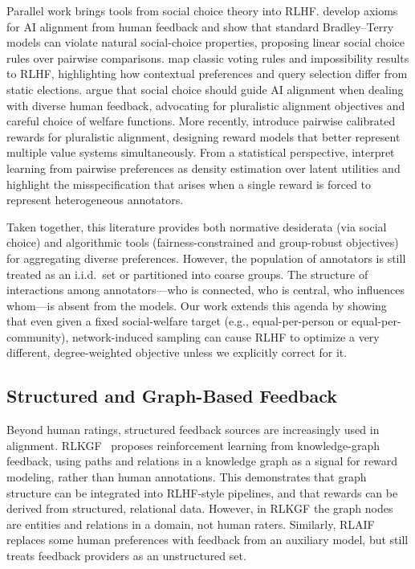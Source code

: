 \documentclass{article}
\theoremstyle{plain}
\theoremstyle{definition}
\theoremstyle{remark}
\begin{document}
Parallel work brings tools from social choice theory into RLHF.
\citet{ge2024axioms} develop axioms for AI alignment from human feedback and show that standard Bradley--Terry models can violate natural social-choice properties, proposing linear social choice rules over pairwise comparisons.
\citet{dai2024mapping} map classic voting rules and impossibility results to RLHF, highlighting how contextual preferences and query selection differ from static elections.
\citet{conitzer2024socialchoice} argue that social choice should guide AI alignment when dealing with diverse human feedback, advocating for pluralistic alignment objectives and careful choice of welfare functions.
More recently, \citet{halpern2025pairwise_calibrated} introduce pairwise calibrated rewards for pluralistic alignment, designing reward models that better represent multiple value systems simultaneously.
From a statistical perspective, \citet{dumoulin2024density_pairwise} interpret learning from pairwise preferences as density estimation over latent utilities and highlight the misspecification that arises when a single reward is forced to represent heterogeneous annotators.

Taken together, this literature provides both normative desiderata (via social choice) and algorithmic tools (fairness-constrained and group-robust objectives) for aggregating diverse preferences.
However, the population of annotators is still treated as an i.i.d.\ set or partitioned into coarse groups.
The structure of interactions among annotators---who is connected, who is central, who influences whom---is absent from the models.
Our work extends this agenda by showing that even given a fixed social-welfare target (e.g., equal-per-person or equal-per-community), network-induced sampling can cause RLHF to optimize a very different, degree-weighted objective unless we explicitly correct for it.

\subsection{Structured and Graph-Based Feedback}
\label{sec:rw_graph_feedback}

Beyond human ratings, structured feedback sources are increasingly used in alignment.
RLKGF~\citep{yan2025rlkgf} proposes reinforcement learning from knowledge-graph feedback, using paths and relations in a knowledge graph as a signal for reward modeling, rather than human annotations.
This demonstrates that graph structure can be integrated into RLHF-style pipelines, and that rewards can be derived from structured, relational data.
However, in RLKGF the graph nodes are entities and relations in a domain, not human raters.
Similarly, RLAIF~\citep{lee2024rlaif} replaces some human preferences with feedback from an auxiliary model, but still treats feedback providers as an unstructured set.
\end{document}
